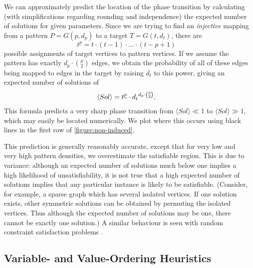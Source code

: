\documentclass[twoside,11pt]{article}
\newcommand{\citep}[1]{\cite{#1}}
\begin{document}
We can approximately predict the location of the phase transition by calculating (with
simplifications regarding rounding and independence) the expected number of solutions for given
parameters. Since we are trying to find an \emph{injective} mapping from a pattern $P = G(p, d_p)$
to a target $T = G(t, d_t)$, there are \[ t^{\underline{p}} = t \cdot (t - 1) \cdot \ldots \cdot (t -
p + 1) \] possible assignments of target vertices to pattern vertices.  If we assume the pattern
has exactly $d_p \cdot \binom{p}{2}$ edges, we obtain the probability of all of these edges being mapped to
edges in the target by raising $d_t$ to this power, giving an expected number of solutions of
\begin{equation}\label{equation:non-induced-prediction}
    \langle Sol \rangle = t^{\underline{p}} \cdot {d_t}^{d_p \cdot \binom{p}{2}} \textnormal{.}
\end{equation} This
formula predicts a very sharp phase transition from $\langle Sol \rangle \ll 1$ to $\langle Sol
\rangle \gg 1$, which may easily be located numerically. We plot where this occurs using black lines
in the first row of \cref{figure:non-induced}.

This prediction is generally reasonably accurate, except that for very low and very high pattern
densities, we overestimate the satisfiable region. This is due to variance: although an expected
number of solutions much below one implies a high likelihood of unsatisfiability, it is not true
that a high expected number of solutions implies that any particular instance is likely to be
satisfiable. (Consider, for example, a sparse graph which has several isolated vertices. If one
solution exists, other symmetric solutions can be obtained by permuting the isolated vertices.
Thus although the expected number of solutions may be one, there cannot be exactly one solution.) A
similar behaviour is seen with random constraint satisfaction problems
\citep{DBLP:journals/ai/SmithD96}.

\subsection{Variable- and Value-Ordering Heuristics}
\end{document}
